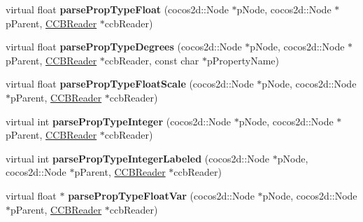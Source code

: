 \begin{DoxyCompactItemize}
\item 
\mbox{\label{classcocosbuilder_1_1NodeLoader_a06e956f6ecd68b6af21c4d47fbba4abc}} 
virtual float {\bfseries parse\+Prop\+Type\+Float} (cocos2d\+::\+Node $\ast$p\+Node, cocos2d\+::\+Node $\ast$p\+Parent, \hyperlink{classcocosbuilder_1_1CCBReader}{C\+C\+B\+Reader} $\ast$ccb\+Reader)
\item 
\mbox{\label{classcocosbuilder_1_1NodeLoader_a239da7a66311e8cb69434840fe735b1e}} 
virtual float {\bfseries parse\+Prop\+Type\+Degrees} (cocos2d\+::\+Node $\ast$p\+Node, cocos2d\+::\+Node $\ast$p\+Parent, \hyperlink{classcocosbuilder_1_1CCBReader}{C\+C\+B\+Reader} $\ast$ccb\+Reader, const char $\ast$p\+Property\+Name)
\item 
\mbox{\label{classcocosbuilder_1_1NodeLoader_a93f43290149f090a41259281c733935c}} 
virtual float {\bfseries parse\+Prop\+Type\+Float\+Scale} (cocos2d\+::\+Node $\ast$p\+Node, cocos2d\+::\+Node $\ast$p\+Parent, \hyperlink{classcocosbuilder_1_1CCBReader}{C\+C\+B\+Reader} $\ast$ccb\+Reader)
\item 
\mbox{\label{classcocosbuilder_1_1NodeLoader_a6e95776299f65ea29bf36dc711f1c040}} 
virtual int {\bfseries parse\+Prop\+Type\+Integer} (cocos2d\+::\+Node $\ast$p\+Node, cocos2d\+::\+Node $\ast$p\+Parent, \hyperlink{classcocosbuilder_1_1CCBReader}{C\+C\+B\+Reader} $\ast$ccb\+Reader)
\item 
\mbox{\label{classcocosbuilder_1_1NodeLoader_a5ead563781de094d2f32a132e082c8cc}} 
virtual int {\bfseries parse\+Prop\+Type\+Integer\+Labeled} (cocos2d\+::\+Node $\ast$p\+Node, cocos2d\+::\+Node $\ast$p\+Parent, \hyperlink{classcocosbuilder_1_1CCBReader}{C\+C\+B\+Reader} $\ast$ccb\+Reader)
\item 
\mbox{\label{classcocosbuilder_1_1NodeLoader_a75066ee6f338c86e58fedb029b2a1057}} 
virtual float $\ast$ {\bfseries parse\+Prop\+Type\+Float\+Var} (cocos2d\+::\+Node $\ast$p\+Node, cocos2d\+::\+Node $\ast$p\+Parent, \hyperlink{classcocosbuilder_1_1CCBReader}{C\+C\+B\+Reader} $\ast$ccb\+Reader)
\item 
\mbox{\label{classcocosbuilder_1_1NodeLoader_abd84859d8d88405ec3b3822012960573}} 

\end{DoxyCompactItemize}
